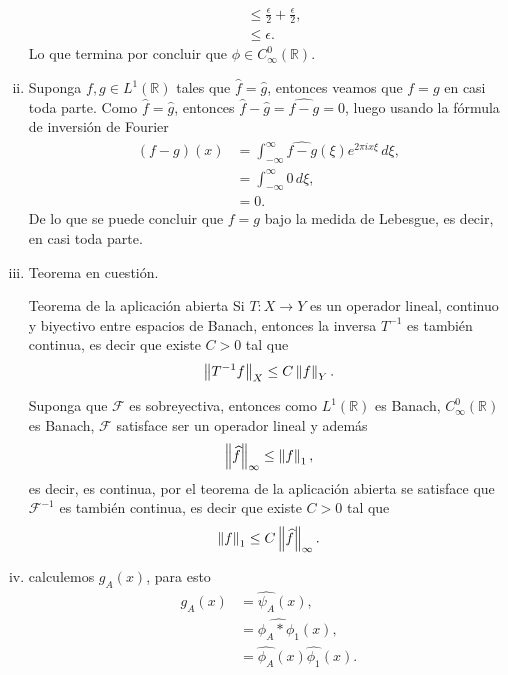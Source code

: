 \begin{homeworkProblem}
\begin{solution}
\begin{enumerate}[(i)]
\begin{align*}
          &\leq \frac{\epsilon}{2}+\frac{\epsilon}{2},\\
          &\leq \epsilon.
        \end{align*}
        Lo que termina por concluir que $\phi\in C^{0}_{\infty}(\mathbb{R})$.
      \item Suponga $f,g\in L^1(\mathbb{R})$ tales que $\hat{f}=\hat{g}$, entonces veamos que $f=g$ en casi toda parte.
        Como $\hat{f}=\hat{g}$, entonces $\hat{f}-\hat{g}=\hat{f-g}=0$, luego usando la fórmula de inversión de Fourier
        \begin{align*}
          (f-g)(x)&=\int_{-\infty}^{\infty}\hat{f-g}(\xi)e^{2\pi i x\xi}\, d\xi,\\
          &=\int_{-\infty}^{\infty}0\, d\xi,\\
          &=0.
        \end{align*}
        De lo que se puede concluir que $f=g$ bajo la medida de Lebesgue, es decir, en casi toda parte.
      \item Teorema en cuestión.\begin{theorem}{Teorema de la aplicación abierta}
          Si $T:X\to Y$ es un operador lineal, continuo y biyectivo entre espacios de Banach, entonces la inversa $T^{-1}$ es también continua, es decir que existe $C>0$ tal que
          \begin{align*}
            \left\|T^{-1}f\right\|_{X}\leq C\left\|f\right\|_{Y}.
          \end{align*}
        \end{theorem}
        Suponga que $\mathcal{F}$ es sobreyectiva, entonces como $L^{1}(\mathbb{R})$ es Banach, $C^{0}_{\infty}(\mathbb{R})$ es Banach, $\mathcal{F}$ satisface ser un operador lineal y además
        \begin{align*}
          \left\|\widehat{f}\right\|_{\infty}\leq \left\|f\right\|_{1},
        \end{align*}
        es decir, es continua, por el teorema de la aplicación abierta se satisface que $\mathcal{F}^{-1}$ es también continua, es decir que existe $C>0$ tal que
        \begin{align*}
          \left\|f\right\|_{1}\leq C\left\|\widehat{f}\right\|_{\infty}.
        \end{align*}
      \item calculemos $g_{A}(x)$, para esto
        \begin{align*}
          g_{A}(x)&=\hat{\psi_{A}}(x),\\
          &=\hat{\phi_{A}*\phi_{1}}(x),\\
          &=\hat{\phi_{A}}(x)\hat{\phi_{1}}(x).

\end{align*}
\end{enumerate}
\end{solution}
\end{homeworkProblem}
